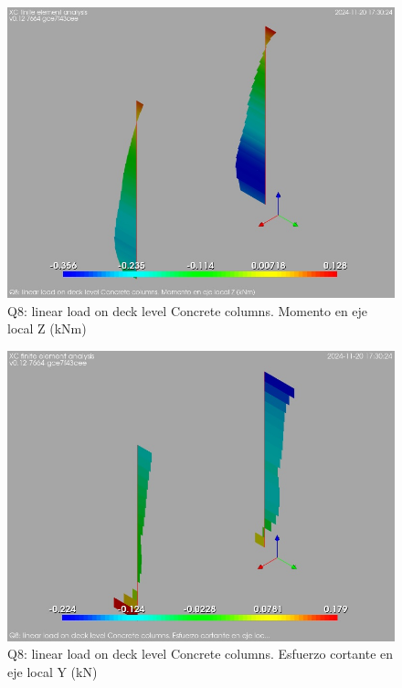 \begin{figure}[ht]
\begin{center}
\includegraphics[width=\linewidth]{results/graphics/resSimplLC/qlinDeckcolumnZconcrMz.png}
\caption{Q8: linear load on deck level Concrete columns. Momento en eje local Z (kNm)}
\label{qlinDeckcolumnZconcrMz}
\end{center}
\end{figure}
\begin{figure}[ht]
\begin{center}
\includegraphics[width=\linewidth]{results/graphics/resSimplLC/qlinDeckcolumnZconcrVy.png}
\caption{Q8: linear load on deck level Concrete columns. Esfuerzo cortante en eje local Y (kN)}
\label{qlinDeckcolumnZconcrVy}
\end{center}
\end{figure}
